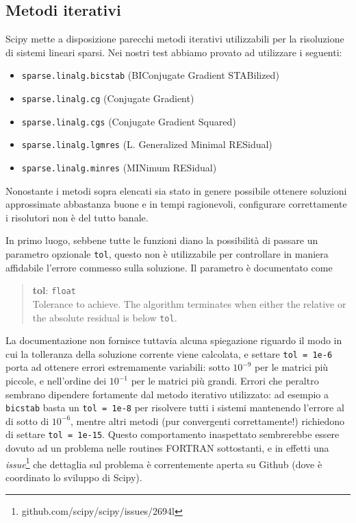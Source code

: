 \documentclass[11pt,a4paper]{scrartcl}
\begin{document}
\subsection*{Metodi iterativi}
Scipy mette a disposizione parecchi metodi iterativi utilizzabili per la risoluzione di sistemi lineari sparsi. Nei nostri test abbiamo provato ad utilizzare i seguenti:
\begin{itemize}
	\item \texttt{sparse.linalg.bicstab} (BIConjugate Gradient STABilized)
	\item \texttt{sparse.linalg.cg} (Conjugate Gradient)
	\item \texttt{sparse.linalg.cgs} (Conjugate Gradient Squared)
	\item \texttt{sparse.linalg.lgmres} (L. Generalized Minimal RESidual)
	\item \texttt{sparse.linalg.minres} (MINimum RESidual)
\end{itemize}

Nonostante i metodi sopra elencati sia stato in genere possibile ottenere soluzioni approssimate abbastanza buone e in tempi ragionevoli, configurare correttamente i risolutori non è del tutto banale.

In primo luogo, sebbene tutte le funzioni diano la possibilità di passare un parametro opzionale \texttt{tol}, questo non è utilizzabile per controllare in maniera affidabile l'errore commesso sulla soluzione. Il parametro è documentato come

\begin{quote}
\textbf{tol}: \texttt{float} \\
Tolerance to achieve. The algorithm terminates when either the relative or the absolute residual is below \texttt{tol}.
\end{quote}

La documentazione non fornisce tuttavia alcuna spiegazione riguardo il modo in cui la tolleranza della soluzione corrente viene calcolata, e settare \texttt{tol = 1e-6} porta ad ottenere errori estremamente variabili: sotto $10^{-9}$ per le matrici più piccole, e nell'ordine dei $10^{-1}$ per le matrici più grandi. Errori che peraltro sembrano dipendere fortamente dal metodo iterativo utilizzato: ad esempio a \texttt{bicstab} basta un \texttt{tol = 1e-8} per risolvere tutti i sistemi mantenendo l'errore al di sotto di $10^{-6}$, mentre altri metodi (pur convergenti correttamente!) richiedono di settare \texttt{tol = 1e-15}. Questo comportamento inaspettato sembrerebbe essere dovuto ad un problema nelle routines FORTRAN sottostanti, e in effetti una \emph{issue}\footnote{github.com/scipy/scipy/issues/2694l} che dettaglia sul problema è correntemente aperta su Github (dove è coordinato lo sviluppo di Scipy).
\end{document}
